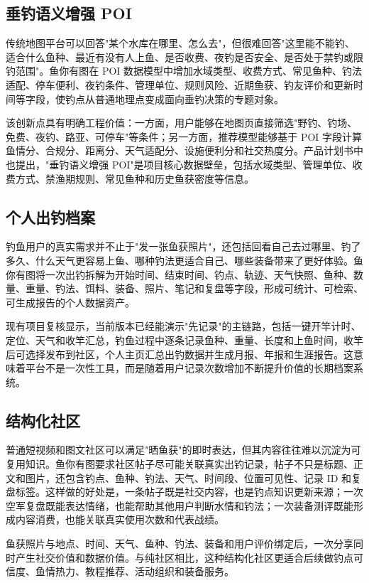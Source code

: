 \subsection{垂钓语义增强 POI}

传统地图平台可以回答"某个水库在哪里、怎么去"，但很难回答"这里能不能钓、适合什么鱼种、最近有没有人上鱼、是否收费、夜钓是否安全、是否处于禁钓或限钓范围"。鱼你有图在 POI 数据模型中增加水域类型、收费方式、常见鱼种、钓法适配、停车便利、夜钓条件、管理单位、规则风险、近期鱼获、钓友评价和更新时间等字段，使钓点从普通地理点变成面向垂钓决策的专题对象。

该创新点具有明确工程价值：一方面，用户能够在地图页直接筛选"野钓、钓场、免费、夜钓、路亚、可停车"等条件；另一方面，推荐模型能够基于 POI 字段计算鱼情分、合规分、距离分、天气适配分、设施便利分和社交热度分。产品计划书中也提出，"垂钓语义增强 POI"是项目核心数据壁垒，包括水域类型、管理单位、收费方式、禁渔期规则、常见鱼种和历史鱼获密度等信息。

\subsection{个人出钓档案}

钓鱼用户的真实需求并不止于"发一张鱼获照片"，还包括回看自己去过哪里、钓了多久、什么天气更容易上鱼、哪种钓法更适合自己、哪些装备带来了更好体验。鱼你有图将一次出钓拆解为开始时间、结束时间、钓点、轨迹、天气快照、鱼种、数量、重量、钓法、饵料、装备、照片、笔记和复盘等字段，形成可统计、可检索、可生成报告的个人数据资产。

现有项目复核显示，当前版本已经能演示"先记录"的主链路，包括一键开竿计时、定位、天气和收竿汇总，钓鱼过程中逐条记录鱼种、重量、长度和上鱼时间，收竿后可选择发布到社区，个人主页汇总出钓数据并生成月报、年报和生涯报告。这意味着平台不是一次性工具，而是随着用户记录次数增加不断提升价值的长期档案系统。

\subsection{结构化社区}

普通短视频和图文社区可以满足"晒鱼获"的即时表达，但其内容往往难以沉淀为可复用知识。鱼你有图要求社区帖子尽可能关联真实出钓记录，帖子不只是标题、正文和图片，还包含钓点、鱼种、钓法、天气、时间段、位置可见性、记录 ID 和复盘标签。这样做的好处是，一条帖子既是社交内容，也是钓点知识更新来源；一次空军复盘既能表达情绪，也能帮助其他用户判断水情和钓法；一次装备测评既能形成内容消费，也能关联真实使用次数和代表战绩。

鱼获照片与地点、时间、天气、鱼种、钓法、装备和用户评价绑定后，一次分享同时产生社交价值和数据价值。与纯社区相比，这种结构化社区更适合后续做钓点可信度、鱼情热力、教程推荐、活动组织和装备服务。

